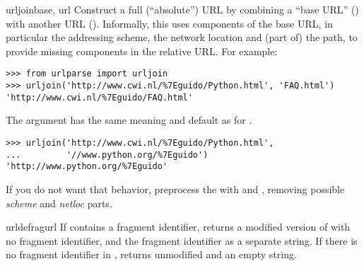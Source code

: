 \begin{funcdesc}{urljoin}{base, url}
Construct a full (``absolute'') URL by combining a ``base URL''
() with another URL ().  Informally, this
uses components of the base URL, in particular the addressing scheme,
the network location and (part of) the path, to provide missing
components in the relative URL.  For example:

\begin{verbatim}
>>> from urlparse import urljoin
>>> urljoin('http://www.cwi.nl/%7Eguido/Python.html', 'FAQ.html')
'http://www.cwi.nl/%7Eguido/FAQ.html'
\end{verbatim}

The  argument has the same meaning and default as
for .


\begin{verbatim}
>>> urljoin('http://www.cwi.nl/%7Eguido/Python.html',
...         '//www.python.org/%7Eguido')
'http://www.python.org/%7Eguido'
\end{verbatim}
      
If you do not want that behavior, preprocess
the  with  and ,
removing possible \emph{scheme} and \emph{netloc} parts.
\end{funcdesc}

\begin{funcdesc}{urldefrag}{url}
If  contains a fragment identifier, returns a modified
version of  with no fragment identifier, and the fragment
identifier as a separate string.  If there is no fragment identifier
in , returns  unmodified and an empty string.
\end{funcdesc}


\begin{seealso}
\end{seealso}


